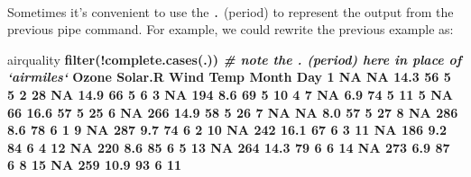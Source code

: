 \documentclass[]{article}
\newenvironment{Shaded}{\begin{snugshade}}{\end{snugshade}}
\newcommand{\CommentTok}[1]{\textcolor[rgb]{0.56,0.35,0.01}{\textit{#1}}}
\newcommand{\DecValTok}[1]{\textcolor[rgb]{0.00,0.00,0.81}{#1}}
\newcommand{\FloatTok}[1]{\textcolor[rgb]{0.00,0.00,0.81}{#1}}
\newcommand{\KeywordTok}[1]{\textcolor[rgb]{0.13,0.29,0.53}{\textbf{#1}}}
\newcommand{\NormalTok}[1]{#1}
\newcommand{\OperatorTok}[1]{\textcolor[rgb]{0.81,0.36,0.00}{\textbf{#1}}}
\newcommand{\OtherTok}[1]{\textcolor[rgb]{0.56,0.35,0.01}{#1}}
\newcommand{\StringTok}[1]{\textcolor[rgb]{0.31,0.60,0.02}{#1}}
\let\oldparagraph\paragraph
\renewcommand{\paragraph}[1]{\oldparagraph{#1}\mbox{}}
\begin{document}
\hypertarget{section-4}{%
\paragraph{}\label{section-4}}

Sometimes it's convenient to use the \texttt{.} (period) to represent the output from the previous pipe command. For example, we could rewrite the previous example as:

\begin{Shaded}
\begin{Highlighting}[]
\NormalTok{airquality }\OperatorTok{%
\StringTok{  }\KeywordTok{filter}\NormalTok{(}\OperatorTok{!}\KeywordTok{complete.cases}\NormalTok{(.))  }\CommentTok{# note the . (period) here in place of `airmiles`}
\NormalTok{   Ozone Solar.R Wind Temp Month Day}
\DecValTok{1}     \OtherTok{NA}      \OtherTok{NA} \FloatTok{14.3}   \DecValTok{56}     \DecValTok{5}   \DecValTok{5}
\DecValTok{2}     \DecValTok{28}      \OtherTok{NA} \FloatTok{14.9}   \DecValTok{66}     \DecValTok{5}   \DecValTok{6}
\DecValTok{3}     \OtherTok{NA}     \DecValTok{194}  \FloatTok{8.6}   \DecValTok{69}     \DecValTok{5}  \DecValTok{10}
\DecValTok{4}      \DecValTok{7}      \OtherTok{NA}  \FloatTok{6.9}   \DecValTok{74}     \DecValTok{5}  \DecValTok{11}
\DecValTok{5}     \OtherTok{NA}      \DecValTok{66} \FloatTok{16.6}   \DecValTok{57}     \DecValTok{5}  \DecValTok{25}
\DecValTok{6}     \OtherTok{NA}     \DecValTok{266} \FloatTok{14.9}   \DecValTok{58}     \DecValTok{5}  \DecValTok{26}
\DecValTok{7}     \OtherTok{NA}      \OtherTok{NA}  \FloatTok{8.0}   \DecValTok{57}     \DecValTok{5}  \DecValTok{27}
\DecValTok{8}     \OtherTok{NA}     \DecValTok{286}  \FloatTok{8.6}   \DecValTok{78}     \DecValTok{6}   \DecValTok{1}
\DecValTok{9}     \OtherTok{NA}     \DecValTok{287}  \FloatTok{9.7}   \DecValTok{74}     \DecValTok{6}   \DecValTok{2}
\DecValTok{10}    \OtherTok{NA}     \DecValTok{242} \FloatTok{16.1}   \DecValTok{67}     \DecValTok{6}   \DecValTok{3}
\DecValTok{11}    \OtherTok{NA}     \DecValTok{186}  \FloatTok{9.2}   \DecValTok{84}     \DecValTok{6}   \DecValTok{4}
\DecValTok{12}    \OtherTok{NA}     \DecValTok{220}  \FloatTok{8.6}   \DecValTok{85}     \DecValTok{6}   \DecValTok{5}
\DecValTok{13}    \OtherTok{NA}     \DecValTok{264} \FloatTok{14.3}   \DecValTok{79}     \DecValTok{6}   \DecValTok{6}
\DecValTok{14}    \OtherTok{NA}     \DecValTok{273}  \FloatTok{6.9}   \DecValTok{87}     \DecValTok{6}   \DecValTok{8}
\DecValTok{15}    \OtherTok{NA}     \DecValTok{259} \FloatTok{10.9}   \DecValTok{93}     \DecValTok{6}  \DecValTok{11}
}
\end{Highlighting}
\end{Shaded}
\end{document}
